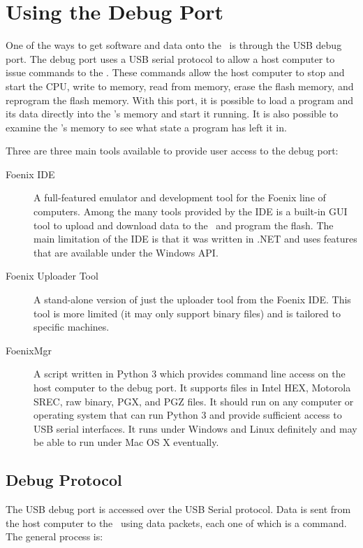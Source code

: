 \chapter{Using the Debug Port}

One of the ways to get software and data onto the \jr\ is through the USB debug port. The debug port uses a USB serial protocol to allow a host computer to issue commands to the \jr. These commands allow the host computer to stop and start the CPU, write to memory, read from memory, erase the flash memory, and reprogram the flash memory. With this port, it is possible to load a program and its data directly into the \jr's memory and start it running. It is also possible to examine the \jr's memory to see what state a program has left it in.

Three are three main tools available to provide user access to the debug port:

\begin{description}
    \item[Foenix IDE] A full-featured emulator and development tool for the Foenix line of computers. Among the many tools provided by the IDE is a built-in GUI tool to upload and download data to the \jr\ and program the flash. The main limitation of the IDE is that it was written in .NET and uses features that are available under the Windows API.

    \item[Foenix Uploader Tool] A stand-alone version of just the uploader tool from the Foenix IDE. This tool is more limited (it may only support binary files) and is tailored to specific machines.

    \item[FoenixMgr] A script written in Python 3 which provides command line access on the host computer to the debug port. It supports files in Intel HEX, Motorola SREC, raw binary, PGX, and PGZ files. It should run on any computer or operating system that can run Python 3 and provide sufficient access to USB serial interfaces. It runs under Windows and Linux definitely and may be able to run under Mac OS X eventually.
\end{description}

\section*{Debug Protocol}

The USB debug port is accessed over the USB Serial protocol. Data is sent from the host computer to the \jr\ using data packets, each one of which is a command. The general process is:

